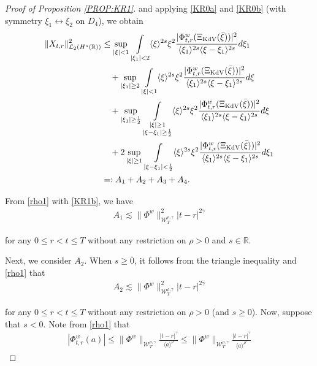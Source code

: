 \documentclass[letterpaper, 11pt,  reqno]{amsart}
\DeclareMathOperator*{\intt}{\int}
\newcommand{\1}{\hspace{0.5mm}\text{I}\hspace{0.5mm}}
\newcommand{\noi}{\noindent}
\newcommand{\R}{\mathbb{R}}
\newcommand{\g}{\gamma}
\newcommand{\les}{\lesssim}
\newcommand{\jb}[1]
{\langle #1 \rangle}
\newcommand{\cL}{\mathcal{L}}
\newcommand{\W}{\mathcal{W}}
\newcommand{\KDV}{\text{\rm KdV} }
\numberwithin{equation}{section}
\numberwithin{theorem}{section}
\begin{document}
\begin{proof}[Proof of Proposition \ref{PROP:KR1}]
\noi
and applying \eqref{KR0a} and \eqref{KR0b}
(with symmetry $\xi_1\leftrightarrow\xi_2$ on $D_4$), 
we obtain
\begin{align}
\|X_{t , r }\|^2_{\cL _2 (H^s (\R))}
 &
\le
\sup_{|\xi|< 1} 
  \intt_{|\xi_1|< 2} 
  \jb{\xi}^{ 2s }\xi^2
   \frac{|\Phi^{w}_{t,r} (\Xi_\KDV(\bar \xi)) |^2}{ \jb{\xi_1}^{2s}  \jb{\xi - \xi_1}^{2s}}  d\xi_1
\notag \\
& \quad + 
\sup_{|\xi_1|\ge 2}
\intt_{|\xi|< 1} \jb{\xi}^{2s}
\xi^2
\frac{|\Phi^{w}_{t,r} (\Xi_\KDV(\bar \xi)) |^2}{\jb{\xi_1}^{2s}\jb{\xi - \xi_1}^{2s}} d\xi
\notag \\ 
& \quad +
\sup_{|\xi_1|\ge \frac 12}
\intt_{\substack{|\xi|\ge 1\\|\xi-\xi_1|\ge \frac 12 }} 
\jb{\xi}^{2s}\xi^2
\frac{|\Phi^{w}_{t,r} (\Xi_\KDV(\bar \xi)) |^2}{\jb{\xi_1}^{2s}\jb{\xi - \xi_1}^{2s}} d\xi
\label{KR2} \\
& \quad +
2\sup_{|\xi|\ge 1} 
  \intt_{|\xi - \xi_1|< \frac 12} 
  \jb{\xi}^{ 2s }\xi^2
   \frac{|\Phi^{w}_{t,r} (\Xi_\KDV(\bar \xi)) |^2}{ \jb{\xi_1}^{2s}  \jb{\xi - \xi_1}^{2s}}  d\xi_1
\notag \\
& =:
A_1+ A_2 + A_3 + A_4.
\notag
\end{align}





From \eqref{rho1} with \eqref{KR1b}, we have 
\begin{align}
A_1 
\les  \|\Phi^w\|^2_{\W_T^{\rho,\g}} |t-r |^{2\g}
\label{KR3}
\end{align}

\noi
\noi
for any $0 \le r <  t \le T$
without any restriction on  $\rho > 0$ and  $s \in \R$.


Next, we consider $A_2$.
When $s \ge 0$, it follows from the triangle inequality and \eqref{rho1}
that 
\begin{align}
A_2
\les  \|\Phi^w\|^2_{\W_T^{\rho,\g}} |t-r |^{2\g}
\label{KR3a}
\end{align}
 
\noi
for any $0 \le r <  t \le T$
without any restriction on  $\rho > 0$ (and  $s\ge 0$).
Now, suppose that $ s < 0$. Note from \eqref{rho1} that
\begin{align}
|\Phi^w_{t,r}(a)|
\le
\|\Phi^w\|_{\W^{\rho,\g}_T}
\frac{|t-r|^\g}{ \jb{a}^{\rho}}
\le
\|\Phi^w\|_{\W^{\rho,\g}_T}
\frac{|t-r|^\g}{ \jb{a}^{\rho'}}
\label{KR3b}
\end{align}


\end{proof}
\end{document}
